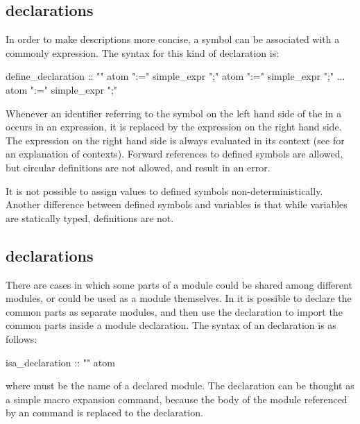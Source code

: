 \subsection{ declarations}
\label{DEFINE declarations}
%
In order to make descriptions more concise, a symbol can be associated
with a commonly expression. The syntax for this kind of declaration
is:
%
\begin{Grammar}
define_declaration :: ""
                    atom ":=" simple_expr ";"
                    atom ":=" simple_expr ";"
                    ...
                    atom ":=" simple_expr ";"
\end{Grammar}
%
Whenever an identifier referring to the symbol on the left hand side
of the  in a  occurs in an expression, it is
replaced by the expression on the right hand side. The expression on
the right hand side is always evaluated in its context (see
 for an explanation of contexts). Forward
references to defined symbols are allowed, but circular definitions
are not allowed, and result in an error.

It is not possible to assign values to defined symbols
non-deterministically. Another difference between defined symbols and
variables is that while variables are statically typed, definitions
are not.

\subsection{ declarations}
\label{ISA declarations}
%
There are cases in which some parts of a module could be shared among
different modules, or could be used as a module themselves. In \nusmv
it is possible to declare the common parts as separate modules, and
then use the  declaration to import the common parts inside
a module declaration. The syntax of an  declaration is as
follows:
%
\begin{Grammar}
isa_declaration :: "" atom
\end{Grammar}
%
where  must be the name of a declared module.  The
 declaration can be thought as a simple macro expansion
command, because the body of the module referenced by an 
command is replaced to the  declaration.

